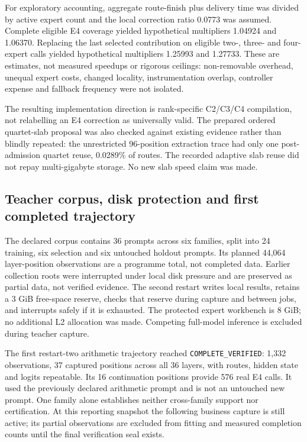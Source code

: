 For exploratory accounting, aggregate route-finish plus delivery time was
divided by active expert count and the local correction ratio 0.0773 was
assumed. Complete eligible E4 coverage yielded hypothetical multipliers
1.04924 and 1.06370. Replacing the last selected contribution on eligible
two-, three- and four-expert calls yielded hypothetical multipliers 1.25993
and 1.27733. These are estimates, not measured speedups or rigorous ceilings:
non-removable overhead, unequal expert costs, changed locality, instrumentation
overlap, controller expense and fallback frequency were not isolated.

The resulting implementation direction is rank-specific C2/C3/C4 compilation,
not relabelling an E4 correction as universally valid. The prepared ordered
quartet-slab proposal was also checked against existing evidence rather than
blindly repeated: the unrestricted 96-position extraction trace had only one
post-admission quartet reuse, 0.0289\% of routes. The recorded adaptive slab
reuse did not repay multi-gigabyte storage. No new slab speed claim was made.

\subsection{Teacher corpus, disk protection and first completed trajectory}
The declared corpus contains 36 prompts across six families, split into
24 training, six selection and six untouched holdout prompts. Its planned
44,064 layer-position observations are a programme total, not completed data.
Earlier collection roots were interrupted under local disk pressure and are
preserved as partial data, not verified evidence. The second restart writes
local results, retains a 3 GiB free-space reserve, checks that reserve during
capture and between jobs, and interrupts safely if it is exhausted.
The protected expert workbench is 8 GiB; no additional L2 allocation was made.
Competing full-model inference is excluded during teacher capture.

The first restart-two arithmetic trajectory reached
\texttt{COMPLETE\_VERIFIED}: 1,332 observations, 37 captured positions across
all 36 layers, with routes, hidden state and logits repeatable. Its 16
continuation positions provide 576 real E4 calls. It used the previously
declared arithmetic prompt and is not an untouched new prompt.
One family alone establishes neither cross-family support nor certification.
At this reporting snapshot the following business capture is still active;
its partial observations are excluded from fitting and measured completion
counts until the final verification seal exists.

